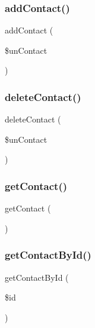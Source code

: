 \subsubsection{\texorpdfstring{add\+Contact()}{addContact()}}
{\footnotesize\ttfamily add\+Contact (\begin{DoxyParamCaption}\item[{}]{\$un\+Contact }\end{DoxyParamCaption})}

\mbox{\label{class_contact_d_a_o_ad1e4f25c7bfbdabca4cc023034ac7eb0}} 
\subsubsection{\texorpdfstring{delete\+Contact()}{deleteContact()}}
{\footnotesize\ttfamily delete\+Contact (\begin{DoxyParamCaption}\item[{}]{\$un\+Contact }\end{DoxyParamCaption})}

\mbox{\label{class_contact_d_a_o_a349e30fba510419883ae407dce4775e1}} 
\subsubsection{\texorpdfstring{get\+Contact()}{getContact()}}
{\footnotesize\ttfamily get\+Contact (\begin{DoxyParamCaption}{ }\end{DoxyParamCaption})}

\mbox{\label{class_contact_d_a_o_a979717275ed9bc4280fd4c9a32c2e3a9}} 
\subsubsection{\texorpdfstring{get\+Contact\+By\+Id()}{getContactById()}}
{\footnotesize\ttfamily get\+Contact\+By\+Id (\begin{DoxyParamCaption}\item[{}]{\$id }\end{DoxyParamCaption})}

